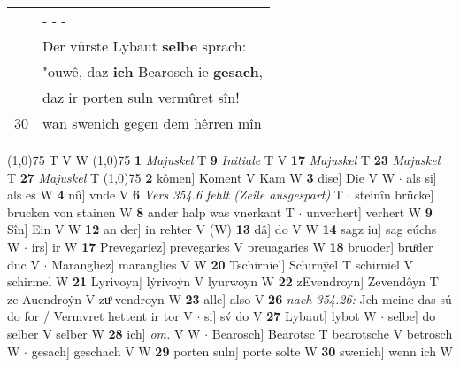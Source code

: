 \documentclass[8pt,a4paper,notitlepage]{article}
\begin{document}
\begin{table}[ht]
\begin{minipage}[t]{0.5\linewidth}
\begin{tabular}{rl}
 & \multicolumn{1}{l}{ - - - }\\ 
 & Der vürste Lybaut \textbf{selbe} sprach:\\ 
 & "ouwê, daz \textbf{ich} Bearosch ie \textbf{gesach},\\ 
 & daz ir porten suln vermûret sîn!\\ 
30 & wan swenich gegen dem hêrren mîn\\ 
\end{tabular}
\scriptsize
\line(1,0){75} \newline
T V W \newline
\line(1,0){75} \newline
\textbf{1} \textit{Majuskel} T  \textbf{9} \textit{Initiale} T V  \textbf{17} \textit{Majuskel} T  \textbf{23} \textit{Majuskel} T  \textbf{27} \textit{Majuskel} T  \newline
\line(1,0){75} \newline
\textbf{2} kômen] Koment V Kam W \textbf{3} dise] Die V W  $\cdot$ als si] als es W \textbf{4} nû] vnde V \textbf{6} \textit{Vers 354.6 fehlt (Zeile ausgespart)} T   $\cdot$ steinîn brücke] brucken von stainen W \textbf{8} ander halp was vnerkant T  $\cdot$ unverhert] verhert W \textbf{9} Sîn] Ein V W \textbf{12} an der] in rehter V (W) \textbf{13} dâ] do V W \textbf{14} sagz iu] sag eúchs W  $\cdot$ irs] ir W \textbf{17} Prevegariez] prevegaries V preuagaries W \textbf{18} bruoder] bruͦder duc V  $\cdot$ Marangliez] maranglies V W \textbf{20} Tschirniel] Schirnŷel T schirniel V schirmel W \textbf{21} Lyrivoyn] lẏrivoẏn V lyurwoyn W \textbf{22} zEvendroyn] Zevendôyn T ze Auendroẏn V zuͦ vendroyn W \textbf{23} alle] also V \textbf{26} \textit{nach 354.26:} Jch meine das sú do for / Vermvret hettent ir tor V   $\cdot$ si] sv́ do V \textbf{27} Lybaut] lybot W  $\cdot$ selbe] do selber V selber W \textbf{28} ich] \textit{om.} V W  $\cdot$ Bearosch] Bearotsc T bearotsche V betrosch W  $\cdot$ gesach] geschach V W \textbf{29} porten suln] porte solte W \textbf{30} swenich] wenn ich W \newline
\end{minipage}
\end{table}
\end{document}
